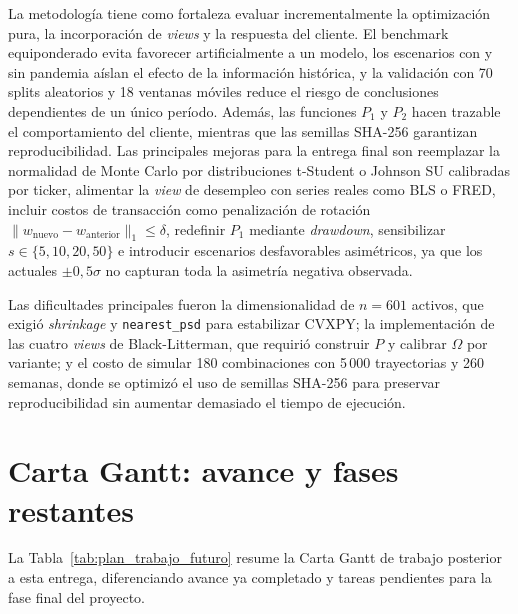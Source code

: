 La metodolog\'ia tiene como fortaleza evaluar incrementalmente la optimizaci\'on pura, la incorporaci\'on de \textit{views} y la respuesta del cliente. El benchmark equiponderado evita favorecer artificialmente a un modelo, los escenarios con y sin pandemia a\'islan el efecto de la informaci\'on hist\'orica, y la validaci\'on con 70 splits aleatorios y 18 ventanas m\'oviles reduce el riesgo de conclusiones dependientes de un \'unico per\'iodo. Adem\'as, las funciones $P_1$ y $P_2$ hacen trazable el comportamiento del cliente, mientras que las semillas SHA-256 garantizan reproducibilidad. Las principales mejoras para la entrega final son reemplazar la normalidad de Monte Carlo por distribuciones t-Student o Johnson SU calibradas por ticker, alimentar la \textit{view} de desempleo con series reales como BLS o FRED, incluir costos de transacci\'on como penalizaci\'on de rotaci\'on $\|w_{\text{nuevo}} - w_{\text{anterior}}\|_1 \leq \delta$, redefinir $P_1$ mediante \textit{drawdown}, sensibilizar $s \in \{5, 10, 20, 50\}$ e introducir escenarios desfavorables asim\'etricos, ya que los actuales $\pm 0{,}5\sigma$ no capturan toda la asimetr\'ia negativa observada.

Las dificultades principales fueron la dimensionalidad de $n = 601$ activos, que exigi\'o \textit{shrinkage} y \texttt{nearest\_psd} para estabilizar CVXPY; la implementaci\'on de las cuatro \textit{views} de Black-Litterman, que requiri\'o construir $P$ y calibrar $\Omega$ por variante; y el costo de simular 180 combinaciones con 5\,000 trayectorias y 260 semanas, donde se optimiz\'o el uso de semillas SHA-256 para preservar reproducibilidad sin aumentar demasiado el tiempo de ejecuci\'on. 

\section{Carta Gantt: avance y fases restantes}

La Tabla~\ref{tab:plan_trabajo_futuro} resume la Carta Gantt de trabajo
posterior a esta entrega, diferenciando avance ya completado y tareas
pendientes para la fase final del proyecto.

